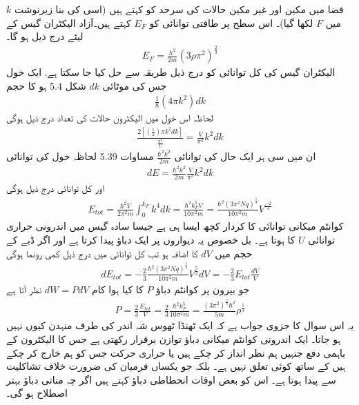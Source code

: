 \documentclass[leqno, b5paper]{khalid-urdu-book}
\begin{document}
$k$ فضا میں مکین اور غیر مکین حالات کی سرحد کو  کہتے ہیں (اسی کی بنا زیرنوشت میں $F$ لکھا گیا)۔
اس سطح پر طاقتی توانائی کو  $E_F$ کہتے ہیں۔آزاد الیکٹران گیس کے لیئے درج ذیل ہو گا۔
\begin{align}
	E_F = \frac{h^{2}}{2m}(3\rho\pi^{2})^{\frac{2}{3}}
\end{align}
الیکٹران گیس کی کل توانائی کو درج ذیل طریقہ سے حل کیا جا سکتا ہے. ایک خول جس کی موٹائی $dk$ شکل \num{5.4} ہو کا حجم
\begin{align*}
	\frac{1}{8}(4\pi k^{2})dk
\end{align*}
لحاظہ اس خول میں الیکٹرون حالات کی تعداد درج ذیل ہوگی
\begin{align*}
	\frac{2[(\frac{1}{2})\pi k^{2}dk]}{\frac{\pi^{3}}{V}} = \frac{V}{\pi^{2}}k^{2}dk
\end{align*}
ان میں سی ہر ایک حال کی توانائی \(\frac{\hbar^{2}k^{2}}{2m}\) مساوات \num{5.39} لحاظہ خول کی توانائی
\begin{align}
	dE = \frac{\hbar^{2}k^2}{2m} \frac{V}{\pi^{2}}k^{2}dk
\end{align}
اور کل توانائی درج ذیل ہوگی
\begin{align}
	E_{tot}=\frac{\hbar^{2}V}{2\pi^{2}m}\int_{0}^{k_F}k^{4}dk = \frac{\hbar^{2}k^{5}_F V}{10\pi^{2}m} = \frac{\hbar^{2}(3\pi^{2}Nq)^{\frac{5}{3}}}{10\pi^{2}m}V^{\frac{-2}{3}}
\end{align}
کوانٹم میکانی توانائی کا کردار کچھ ایسا ہی ہے جیسا سادہ گیس میں اندرونی حراری توانائی $U$ کا ہوتا ہے۔ بل خصوص یہ دیواروں پر ایک دباؤ پیدا کرتا ہے اور اگر ڈبے کے حجم میں $dV$ کا اضافہ ہو تب کل توانائی میں درج ذیل کمی رونما ہوگی
\begin{align*}
	dE_{tot} = -\frac{2}{3}\frac{\hbar^2(3\pi^{2}Nq)^{\frac{5}{3}}}{10\pi^{2}m}V^{\frac{5}{3}}dV = -\frac{2}{3}E_{tot}\frac{dV}{V}
\end{align*}
جو بیرون پر کوانٹم دباؤ $P$ کا کیا ہوا کام \(dW = PdV\) نظر آتا ہے
\begin{align}
	P = \frac{2}{3}\frac{E_{tot}}{V} = \frac{2}{3}\frac{\hbar^{2}k^{5}_F}{10\pi^{2}m} = \frac{(3\pi^{2})^{\frac{2}{3}}\hbar^{2}}{5m}\rho^{\frac{5}{3}}
\end{align}
یہ اس سوال کا جزوی جواب ہے کہ ایک ٹھنڈا ٹھوس شہ اندر کی طرف منہدن کیوں نہیں ہو جاتا۔ ایک اندرونی کوانٹم میکانی دباؤ توازن برقرار رکھتی ہے جس کا الیکٹرون کے  باہمی دفع جنہیں ہم نظر انداز کر چکے ہیں یا حراری حرکت جس کو ہم خارج کر چکے ہیں کے ساتھ کوئی تعلق نہیں ہے۔ بلکہ جو یکساں فرمیان کی ضرورت خلاف تشاکلیت سے پیدا ہوتا ہے۔ اس کو بعض اوقات انحطاطی دباؤ کہتے ہیں اگر چہ مناتی دباؤ بہتر اصطلاح ہو گی۔
\end{document}
